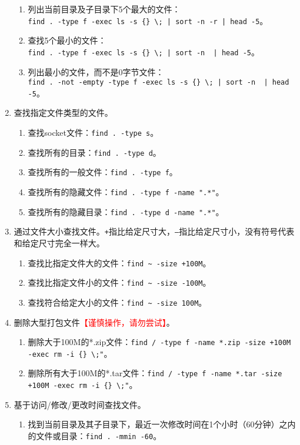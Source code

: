\begin{enumerate}
\begin{enumerate}
      \item 列出当前目录及子目录下5个最大的文件：\\ \verb=find . -type f -exec ls -s {} \; | sort -n -r | head -5=。
      \item 查找5个最小的文件：\\ \verb=find . -type f -exec ls -s {} \; | sort -n  | head -5=。
      \item 列出最小的文件，而不是0字节文件：\\ \verb=find . -not -empty -type f -exec ls -s {} \; | sort -n  | head -5=。
    \end{enumerate}
  \item 查找指定文件类型的文件。
    \begin{enumerate}
      \item 查找socket文件：\verb|find . -type s|。
      \item 查找所有的目录：\verb|find . -type d|。
      \item 查找所有的一般文件：\verb|find . -type f|。
      \item 查找所有的隐藏文件：\verb|find . -type f -name ".*"|。
      \item 查找所有的隐藏目录：\verb|find . -type d -name ".*"|。
    \end{enumerate}
  \item 通过文件大小查找文件。\verb|+|指比给定尺寸大，\verb|–|指比给定尺寸小，没有符号代表和给定尺寸完全一样大。 
    \begin{enumerate}
      \item 查找比指定文件大的文件：\verb|find ~ -size +100M|。
      \item 查找比指定文件小的文件：\verb|find ~ -size -100M|。
      \item 查找符合给定大小的文件：\verb|find ~ -size 100M|。
    \end{enumerate}
  \item 删除大型打包文件\textcolor{red}{【谨慎操作，请勿尝试】}。
    \begin{enumerate}
      \item 删除大于100M的*.zip文件：\verb|find / -type f -name *.zip -size +100M -exec rm -i {} \;"|。
      \item 删除所有大于100M的*.tar文件：\verb|find / -type f -name *.tar -size +100M -exec rm -i {} \;"|。
    \end{enumerate}
  \item 基于访问/修改/更改时间查找文件。
    \begin{enumerate}
      \item 找到当前目录及其子目录下，最近一次修改时间在1个小时（60分钟）之内的文件或目录：\verb|find . -mmin -60|。

\end{enumerate}
\end{enumerate}
